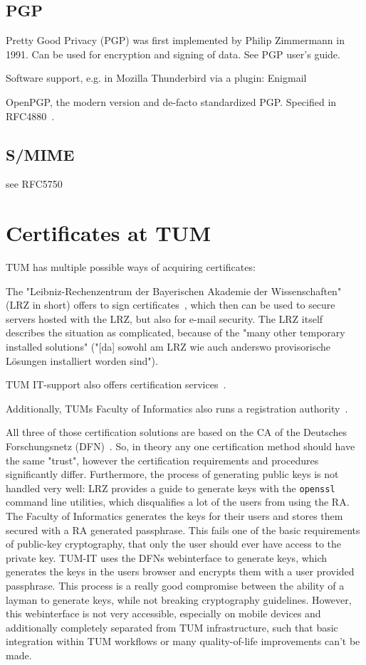 \subsection{PGP}\label{subsec:pgp}

Pretty Good Privacy (PGP) was first implemented by Philip Zimmermann in 1991.
Can be used for encryption and signing of data.
See PGP user's guide.

Software support, e.g. in Mozilla Thunderbird via a plugin: Enigmail

OpenPGP, the modern version and de-facto standardized PGP.
Specified in RFC4880~\cite{RFC4880}.

\subsection{S/MIME}\label{subsec:s/mime}
see RFC5750~\cite{RFC5750}


\section{Certificates at TUM}\label{sec:certificatesAtTum}

TUM has multiple possible ways of acquiring certificates:

The "Leibniz-Rechenzentrum der Bayerischen Akademie der Wissenschaften" (LRZ in short) offers to sign
certificates~\cite{lrzpki}, which then can be used to secure servers hosted with the LRZ, but also for e-mail security.
The LRZ itself describes the situation as complicated, because of the "many other temporary installed solutions"
("[da] sowohl am LRZ wie auch anderswo provisorische L\"osungen installiert worden sind").

TUM IT-support also offers certification services~\cite{tumZertifikat}.

Additionally, TUMs Faculty of Informatics also runs a registration authority~\cite{inTumCertificates}.

All three of those certification solutions are based on the CA of the Deutsches Forschungsnetz (DFN)~\cite{dfnPki}.
So, in theory any one certification method should have the same "trust", however the certification requirements and
procedures significantly differ.
Furthermore, the process of generating public keys is not handled very well: LRZ provides a guide to generate keys with
the \lstinline{openssl} command line utilities, which disqualifies a lot of the users from using the RA\@.
The Faculty of Informatics generates the keys for their users and stores them secured with a RA generated passphrase.
This fails one of the basic requirements of public-key cryptography, that only the user should ever have access to the
private key.
TUM-IT uses the DFNs webinterface to generate keys, which generates the keys in the users browser and encrypts them with
a user provided passphrase.
This process is a really good compromise between the ability of a layman to generate keys, while not breaking
cryptography guidelines.
However, this webinterface is not very accessible, especially on mobile devices and additionally completely separated
from TUM infrastructure, such that basic integration within TUM workflows or many quality-of-life improvements can't be
made.

